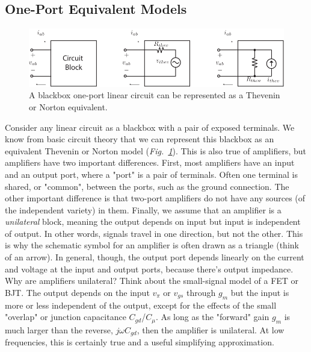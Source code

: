 \subsection{One-Port Equivalent Models}
\begin{figure}[tb]
\centering
\includegraphics[scale=1]{oneports}
\caption{A blackbox one-port linear circuit can be represented as a Thevenin or Norton equivalent.} \label{fig:oneports}
\end{figure}
Consider any linear circuit as a blackbox with a pair of exposed terminals.  We know from basic circuit theory that we can represent this blackbox as an equivalent Thevenin or Norton model (\emph{Fig.~\ref{fig:oneports}}).  This is also true of amplifiers, but amplifiers have two important differences.  First, most amplifiers have an input and an output port, where a "port" is a  pair of terminals.  Often one terminal is shared, or "common", between the ports, such as the ground connection.   The other important difference is that two-port amplifiers do not have any sources (of the independent variety) in them.  Finally, we assume that an amplifier is a \textit{unilateral} block, meaning the output depends on input but input is independent of output.  In other words, signals travel in one direction, but not the other.  This is why the schematic symbol for an amplifier is often drawn as a triangle (think of an arrow).  In general, though, the output port depends linearly on the current and voltage at the input and output ports, because there's output impedance.  
Why are amplifiers unilateral?  Think about the small-signal model of a FET or BJT.  The output depends on the input $v_{\pi}$ or $v_{gs}$ through $g_m$ but the input is more or less independent of the output, except for the effects of the small "overlap" or junction capacitance $C_{gd}$/$C_\mu$.  As long as the "forward" gain $g_m$ is much larger than the reverse, $j\omega C_{gd}$, then the amplifier is unilateral.  At low frequencies, this is certainly true and a useful simplifying approximation.
